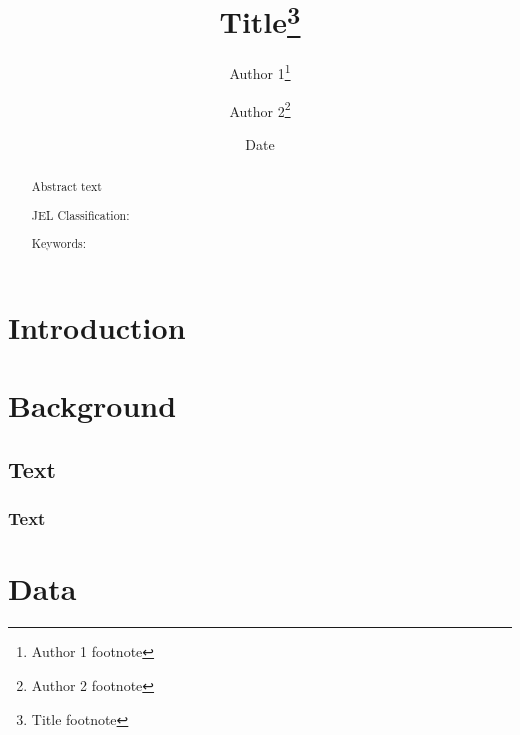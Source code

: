 \documentclass[11pt]{article}
\begin{document}
	
	\title{Title\thanks{Title footnote}\vspace{5ex}}
	
	\author{
		Author 1\thanks{Author 1 footnote}
		\and
		Author 2\thanks{Author 2 footnote}
		\vspace{5ex}
	}
	
	\date{Date}
	
	\maketitle
	\thispagestyle{empty}
	\setcounter{page}{0}
	
	\begin{singlespace}
		\begin{abstract}
			\noindent Abstract text
			
			\bigskip
			
			\noindent JEL Classification:
			
			\bigskip
			
			\noindent Keywords:
		\end{abstract}
	\end{singlespace}
	
	\newpage
	
	
	\section{Introduction}\label{intro}
	
		\lipsum[1-2]
	
	\section{Background}\label{background}
	
		\lipsum[1-1]
		
	\subsection{Text}
	
		\lipsum[1-1]
		
	\subsubsection{Text}
	
		\lipsum[1-1]
		
	\section{Data}\label{data}
\end{document}
